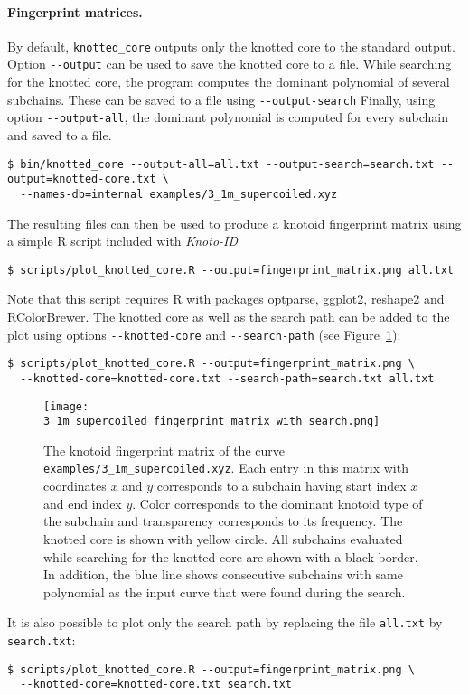 \paragraph{Fingerprint matrices.}
By default, \lstinline{knotted_core} outputs only the knotted core to the standard output. Option \lstinline{--output} can be used to save the knotted core to a file.
While searching for the knotted core, the program computes the dominant polynomial of several subchains. These can be saved to a file using  \lstinline{--output-search}
Finally, using option \lstinline{--output-all}, the dominant polynomial is computed for every subchain and saved to a file. 
\begin{lstlisting}
$ bin/knotted_core --output-all=all.txt --output-search=search.txt --output=knotted-core.txt \
  --names-db=internal examples/3_1m_supercoiled.xyz
\end{lstlisting}
The resulting files can then be used to produce a knotoid fingerprint matrix\cite{yeates, sulkowska2012, gound} using a simple {\ttfamily R} script\cite{r2017} included with {\it Knoto-ID} 
\begin{lstlisting}
$ scripts/plot_knotted_core.R --output=fingerprint_matrix.png all.txt
\end{lstlisting}
Note that this script requires {\ttfamily R}\cite{r2017} with packages {\ttfamily optparse}\cite{optparse}, {\ttfamily ggplot2}\cite{wickham2009}, {\ttfamily reshape2}\cite{reshape2} and {\ttfamily RColorBrewer}\cite{rcolorbrewer}.
The knotted core as well as the search path can be added to the plot using options \lstinline{--knotted-core} and \lstinline{--search-path} (see Figure~\ref{fig:3_1m_supercoiled:fingerprint:search}):
\begin{lstlisting}
$ scripts/plot_knotted_core.R --output=fingerprint_matrix.png \
  --knotted-core=knotted-core.txt --search-path=search.txt all.txt
\end{lstlisting}
\begin{figure}[t]
\centering
\texttt{[image: 3\_1m\_supercoiled\_fingerprint\_matrix\_with\_search.png]}
\caption{ The knotoid fingerprint matrix of the curve \lstinline{examples/3_1m_supercoiled.xyz}. Each entry in this matrix with coordinates $x$ and $y$ corresponds to a subchain having start index $x$ and end index $y$. Color corresponds to the dominant knotoid type of the subchain and transparency corresponds to its frequency. The knotted core is shown with yellow circle. All subchains evaluated while searching for the knotted core are shown with a black border. In addition, the blue line shows consecutive subchains with same polynomial as the input curve that were found during the search.}\label{fig:3_1m_supercoiled:fingerprint:search}
\end{figure}
It is also possible to plot only the search path by replacing the file \lstinline{all.txt} by \lstinline{search.txt}:
\begin{lstlisting}
$ scripts/plot_knotted_core.R --output=fingerprint_matrix.png \
  --knotted-core=knotted-core.txt search.txt
\end{lstlisting}


